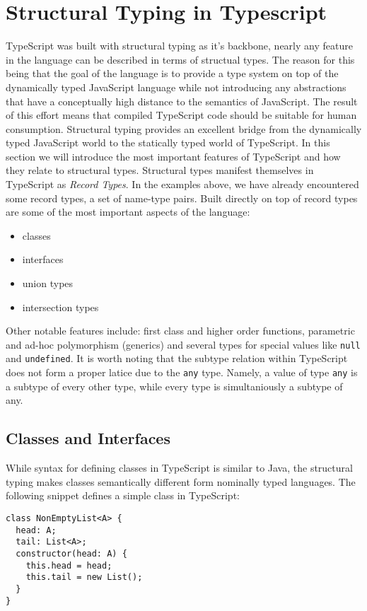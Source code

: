 \section{Structural Typing in Typescript}
\label{sec:structural-typing-typescript}
TypeScript was built with structural typing as it's backbone, 
nearly any feature in the language can be described in terms of structual types.
The reason for this being that the goal of the language is to provide a type system
on top of the dynamically typed JavaScript language while not introducing any 
abstractions that have a conceptually high distance to the semantics of JavaScript.
The result of this effort means that compiled TypeScript code should be suitable 
for human consumption. Structural typing provides an excellent bridge from the 
dynamically typed JavaScript world to the statically typed world of TypeScript.
In this section we will introduce the most important features of TypeScript and
how they relate to structural types.
\bigskip
Structural types manifest themselves in TypeScript as \textit{Record Types}.
In the examples above, we have already encountered some record types, a set of name-type pairs.
Built directly on top of record types are some of the most important aspects of the language:
\begin{itemize}
\item classes
\item interfaces
\item union types
\item intersection types
\end{itemize}

Other notable features include: first class and higher order functions, parametric and ad-hoc polymorphism 
(generics) and several types for special values like \texttt{null} and \texttt{undefined}. It is 
worth noting that the subtype relation within TypeScript does not form a proper latice due to 
the \texttt{any} type. Namely, a value of type \texttt{any} is a subtype of every other type, 
while every type is simultaniously a subtype of any.
\bigskip
\subsection{Classes and Interfaces}
While syntax for defining classes in TypeScript is similar to Java, the structural typing makes classes semantically different form nominally typed languages.
The following snippet defines a simple class in TypeScript:

\begin{lstlisting}
class NonEmptyList<A> {
  head: A;
  tail: List<A>;
  constructor(head: A) {
    this.head = head;
    this.tail = new List();
  }
}
\end{lstlisting}

